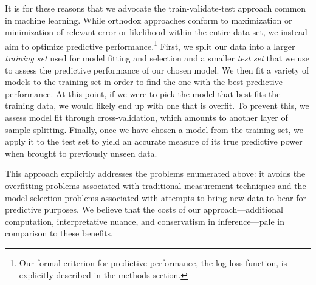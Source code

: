 It is for these reasons that we advocate the train-validate-test approach common in machine learning. 
While orthodox approaches conform to maximization or minimization of relevant error or likelihood within the entire data set, we instead aim to optimize predictive performance.\footnote{Our formal criterion for predictive performance, the log loss function, is explicitly described in the methods section.} 
First, we split our data into a larger \emph{training set} used for model fitting and selection and a smaller \emph{test set} that we use to assess the predictive performance of our chosen model.
We then fit a variety of models to the training set in order to find the one with the best predictive performance.
At this point, if we were to pick the model that best fits the training data, we would likely end up with one that is overfit.
To prevent this, we assess model fit through cross-validation, which amounts to another layer of sample-splitting.
Finally, once we have chosen a model from the training set, we apply it to the test set to yield an accurate measure of its true predictive power when brought to previously unseen data.

This approach explicitly addresses the problems enumerated above: it avoids the overfitting problems associated with traditional measurement techniques and the model selection problems associated with attempts to bring new data to bear for predictive purposes. 
We believe that the costs of our approach---additional computation, interpretative nuance, and conservatism in inference---pale in comparison to these benefits. 

